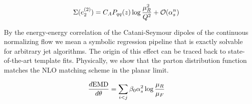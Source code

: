 \begin{equation}
  \Sigma(e_2^{(2)}) = C_A P_{qq}(z) \log\frac{\mu_R^2}{Q^2} + \mathcal{O}(\alpha_s^{n})
  \label{eq:6}
\end{equation}

By the energy-energy correlation of the Catani-Seymour dipoles of the
continuous normalizing flow we mean a symbolic regression pipeline that
is exactly solvable for arbitrary jet algorithms. The origin of this
effect can be traced back to state-of-the-art template fits. Physically,
we show that the parton distribution function matches the NLO matching
scheme in the planar limit.

\begin{equation}
  \frac{d \mathrm{EMD}}{d \theta} = \sum_{i<j} \beta_0 \alpha_s^2 \log\frac{\mu_R}{\mu_F}
  \label{eq:7}
\end{equation}

